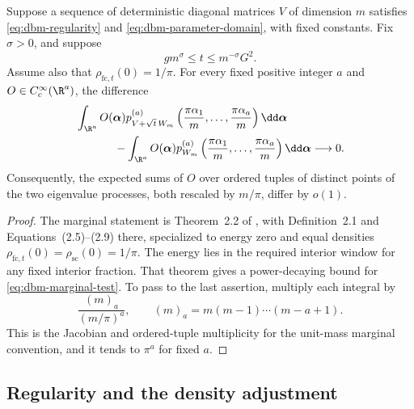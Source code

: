 \begin{theorem}
\label{thm:dbm-input}
Suppose a sequence of deterministic diagonal matrices \(V\) of dimension
\(m\) satisfies \eqref{eq:dbm-regularity} and
\eqref{eq:dbm-parameter-domain}, with fixed constants. Fix \(\sigma>0\),
and suppose
\begin{equation}
 \label{eq:dbm-time-window}
 g m^\sigma\le t\le m^{-\sigma}G^2.
\end{equation}
Assume also that \(\rho_{\mathrm{fc},t}(0)=1/\pi\).
For every fixed positive integer \(a\) and
\(O\in C_c^\infty(\R^a)\), the difference
\begin{align}
 \label{eq:dbm-marginal-test}
 &\int_{\R^a}O(\boldsymbol\alpha)
   p_{V+\sqrt t\,W_m}^{(a)}
      \left(\frac{\pi\alpha_1}{m},\ldots,
            \frac{\pi\alpha_a}{m}\right)
       \dd\boldsymbol\alpha \notag\\
 &\hspace{12mm}-
 \int_{\R^a}O(\boldsymbol\alpha)
   p_{W_m}^{(a)}
      \left(\frac{\pi\alpha_1}{m},\ldots,
            \frac{\pi\alpha_a}{m}\right)
       \dd\boldsymbol\alpha
 \longrightarrow0.
\end{align}
Consequently, the expected sums of \(O\) over ordered tuples of
distinct points of the two eigenvalue processes, both rescaled by
\(m/\pi\), differ by \(o(1)\).
\end{theorem}

\begin{proof}
The marginal statement is Theorem~2.2 of
\citet{LandonSosoeYau}, with Definition~2.1 and Equations~(2.5)--(2.9)
there, specialized to energy zero and equal densities
\(\rho_{\mathrm{fc},t}(0)=\rho_{\mathrm{sc}}(0)=1/\pi\).
The energy lies in the required interior window for any fixed interior
fraction. That theorem gives a power-decaying bound for
\eqref{eq:dbm-marginal-test}. To pass to the last assertion, multiply
each integral by
\[
 \frac{(m)_a}{(m/\pi)^a},
 \qquad
 (m)_a=m(m-1)\cdots(m-a+1).
\]
This is the Jacobian and ordered-tuple multiplicity for the unit-mass
marginal convention, and it tends to \(\pi^a\) for fixed \(a\).
\end{proof}

\subsection{Regularity and the density adjustment}


